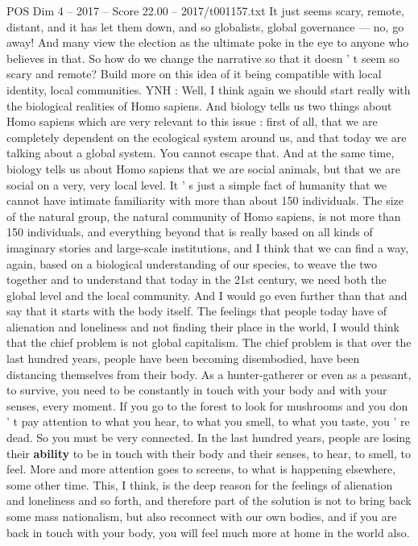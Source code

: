 \begin{textsample}{POS Dim 4 – 2017 – Score 22.00 – 2017/t001157.txt}
It just seems scary, remote, distant, and it has let them down, and so globalists, global governance — no, go away!
And many view the election as the ultimate poke in the eye to anyone who believes in that.
So how do we change the narrative so that it doesn ' t seem so scary and remote?
Build more on this idea of it being compatible with local identity, local communities.
YNH : Well, I think again we should start really with the biological realities of Homo sapiens.
And biology tells us two things about Homo sapiens which are very relevant to this issue : first of all, that we are completely dependent on the ecological system around us, and that today we are talking about a global system.
You cannot escape that.
And at the same time, biology tells us about Homo sapiens that we are social animals, but that we are social on a very, very local level.
It ' s just a simple fact of humanity that we cannot have intimate familiarity with more than about 150 individuals.
The size of the natural group, the natural community of Homo sapiens, is not more than 150 individuals, and everything beyond that is really based on all kinds of imaginary stories and large-scale institutions, and I think that we can find a way, again, based on a biological understanding of our species, to weave the two together and to understand that today in the 21st century, we need both the global level and the local community.
And I would go even further than that and say that it starts with the body itself.
The feelings that people today have of alienation and loneliness and not finding their place in the world, I would think that the chief problem is not global capitalism.
The chief problem is that over the last hundred years, people have been becoming disembodied, have been distancing themselves from their body.
As a hunter-gatherer or even as a peasant, to survive, you need to be constantly in touch with your body and with your senses, every moment.
If you go to the forest to look for mushrooms and you don ' t pay attention to what you hear, to what you smell, to what you taste, you ' re dead.
So you must be very connected.
In the last hundred years, people are losing their \textbf{ability} to be in touch with their body and their senses, to hear, to smell, to feel.
More and more attention goes to screens, to what is happening elsewhere, some other time.
This, I think, is the deep reason for the feelings of alienation and loneliness and so forth, and therefore part of the solution is not to bring back some mass nationalism, but also reconnect with our own bodies, and if you are back in touch with your body, you will feel much more at home in the world also.

\end{textsample}
